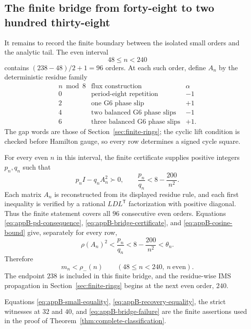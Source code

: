 \subsection{The finite bridge from forty-eight to two hundred thirty-eight}
\label{app:finite-bridge}

It remains to record the finite boundary between the isolated
small orders and the analytic tail.  The even interval
\[
 48\leq n<240
\]
contains \((238-48)/2+1=96\) orders. At each such order, define
\(A_n\) by the deterministic residue family
\[
\begin{array}{c|l|c}
n\bmod8&\text{flux construction}&\alpha\\
\hline
0&\text{period-eight repetition}&-1\\
2&\text{one G6 phase slip}&+1\\
4&\text{two balanced G6 phase slips}&-1\\
6&\text{three balanced G6 phase slips}&+1.
\end{array}
\]
The gap words are those of Section~\ref{sec:finite-rings}; the cyclic lift
condition is checked before Hamilton gauge, so every row determines a signed
cycle square.

For every even \(n\) in this interval, the finite certificate supplies
positive integers \(p_n,q_n\) such that
\begin{equation}\label{eq:appB-bridge-certificate}
 p_nI-q_nA_n^2\succ0,
 \qquad
 \frac{p_n}{q_n}<8-\frac{200}{n^2}.
\end{equation}
Each matrix \(A_n\) is reconstructed from its displayed residue rule, and
each first inequality is verified by a rational
\(LDL^{\mathsf T}\) factorization with positive diagonal.  Thus the finite
statement covers all \(96\) consecutive even orders. Equations
\eqref{eq:appB-pd-consequence}, \eqref{eq:appB-bridge-certificate}, and
\eqref{eq:appB-cosine-bound} give, separately for every row,
\[
 \rho(A_n)^2
 <\frac{p_n}{q_n}
 <8-\frac{200}{n^2}
 <\theta_n.
\]
Therefore
\begin{equation}\label{eq:appB-bridge-failure}
 m_n<\rho_-(n)
 \qquad(48\leq n<240,\ n\ \text{even}).
\end{equation}
The endpoint \(238\) is included in this finite bridge, and the residue-wise
IMS propagation in Section~\ref{sec:finite-rings} begins at the next even
order, \(240\).

Equations \eqref{eq:appB-small-equality},
\eqref{eq:appB-recovery-equality}, the strict witnesses at \(32\) and
\(40\), and \eqref{eq:appB-bridge-failure} are the finite assertions
used in the proof of Theorem~\ref{thm:complete-classification}.
